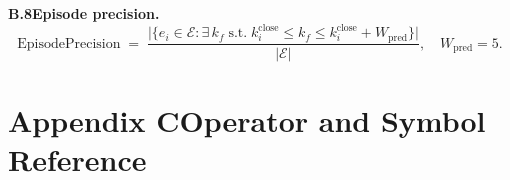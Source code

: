 \documentclass[11pt,letterpaper]{article}
\theoremstyle{scresult}
\begin{document}
\medskip
\noindent\textbf{B.8\quad Episode precision.}
\[
  \text{EpisodePrecision} \;=\;
  \frac{\bigl|\{e_i \in \mathcal{E} : \exists\, k_f \;\text{s.t.}\;
      k_i^{\text{close}} \leq k_f \leq k_i^{\text{close}}+W_{\text{pred}}\}\bigr|}
       {|\mathcal{E}|},
  \quad W_{\text{pred}}=5.
\]

\clearpage

\section*{Appendix C\quad Operator and Symbol Reference}
\label{app:operators}
\end{document}
